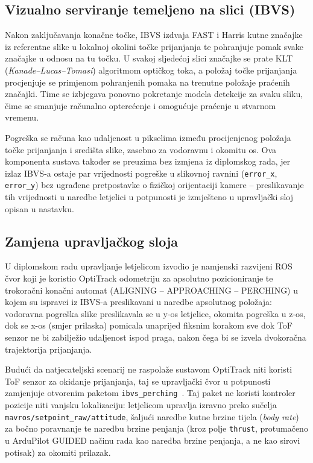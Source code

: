 \subsection{Vizualno serviranje temeljeno na slici (IBVS)}
\label{subsec:ibvs}

Nakon zaključavanja konačne točke, IBVS izdvaja FAST i Harris kutne značajke iz referentne slike u lokalnoj okolini točke prijanjanja te pohranjuje pomak svake značajke u odnosu na tu točku. U svakoj sljedećoj slici značajke se prate KLT (\emph{Kanade--Lucas--Tomasi}) algoritmom optičkog toka, a položaj točke prijanjanja procjenjuje se primjenom pohranjenih pomaka na trenutne položaje praćenih značajki. Time se izbjegava ponovno pokretanje modela detekcije za svaku sliku, čime se smanjuje računalno opterećenje i omogućuje praćenje u stvarnom vremenu.

Pogreška se računa kao udaljenost u pikselima između procijenjenog položaja točke prijanjanja i središta slike, zasebno za vodoravnu i okomitu os. Ova komponenta sustava također se preuzima bez izmjena iz diplomskog rada, jer izlaz IBVS-a ostaje par vrijednosti pogreške u slikovnoj ravnini (\texttt{error\_x}, \texttt{error\_y}) bez ugrađene pretpostavke o fizičkoj orijentaciji kamere -- preslikavanje tih vrijednosti u naredbe letjelici u potpunosti je izmješteno u upravljački sloj opisan u nastavku.

\subsection{Zamjena upravljačkog sloja}
\label{subsec:zamjena-upravljanja}

U diplomskom radu upravljanje letjelicom izvodio je namjenski razvijeni ROS čvor koji je koristio OptiTrack odometriju za apsolutno pozicioniranje te trokoračni konačni automat (ALIGNING -- APPROACHING -- PERCHING) u kojem su ispravci iz IBVS-a preslikavani u naredbe apsolutnog položaja: vodoravna pogreška slike preslikavala se u y-os letjelice, okomita pogreška u z-os, dok se x-os (smjer prilaska) pomicala unaprijed fiksnim korakom sve dok ToF senzor ne bi zabilježio udaljenost ispod praga, nakon čega bi se izvela dvokoračna trajektorija prijanjanja.

Budući da natjecateljski scenarij ne raspolaže sustavom OptiTrack niti koristi ToF senzor za okidanje prijanjanja, taj se upravljački čvor u potpunosti zamjenjuje otvorenim paketom \texttt{ibvs\_perching}~\cite{ibvs_perching}. Taj paket ne koristi kontroler pozicije niti vanjsku lokalizaciju: letjelicom upravlja izravno preko sučelja \texttt{mavros/setpoint\_raw/attitude}, šaljući naredbe kutne brzine tijela (\emph{body rate}) za bočno poravnanje te naredbu brzine penjanja (kroz polje \texttt{thrust}, protumačeno u ArduPilot GUIDED načinu rada kao naredba brzine penjanja, a ne kao sirovi potisak) za okomiti prilazak.

